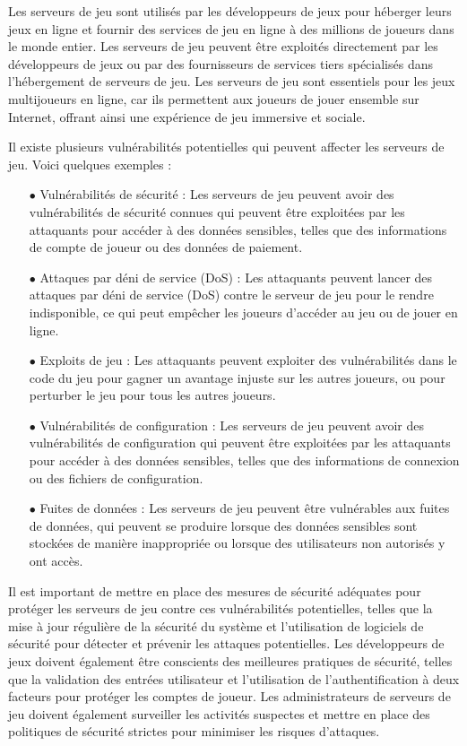Les serveurs de jeu sont utilisés par les développeurs de jeux pour héberger leurs jeux en ligne et fournir des services de jeu en ligne à des millions de joueurs dans le monde entier. Les serveurs de jeu peuvent être exploités directement par les développeurs de jeux ou par des fournisseurs de services tiers spécialisés dans l'hébergement de serveurs de jeu. Les serveurs de jeu sont essentiels pour les jeux multijoueurs en ligne, car ils permettent aux joueurs de jouer ensemble sur Internet, offrant ainsi une expérience de jeu immersive et sociale.
 

Il existe plusieurs vulnérabilités potentielles qui peuvent affecter les serveurs de jeu. Voici quelques exemples :
\begin{enumerate}
\item[$\bullet$]  Vulnérabilités de sécurité : Les serveurs de jeu peuvent avoir des vulnérabilités de sécurité connues qui peuvent être exploitées par les attaquants pour accéder à des données sensibles, telles que des informations de compte de joueur ou des données de paiement.
	
	\item[$\bullet$] Attaques par déni de service (DoS) : Les attaquants peuvent lancer des attaques par déni de service (DoS) contre le serveur de jeu pour le rendre indisponible, ce qui peut empêcher les joueurs d'accéder au jeu ou de jouer en ligne.
	
\item[$\bullet$]  Exploits de jeu : Les attaquants peuvent exploiter des vulnérabilités dans le code du jeu pour gagner un avantage injuste sur les autres joueurs, ou pour perturber le jeu pour tous les autres joueurs.
	
\item[$\bullet$]  Vulnérabilités de configuration : Les serveurs de jeu peuvent avoir des vulnérabilités de configuration qui peuvent être exploitées par les attaquants pour accéder à des données sensibles, telles que des informations de connexion ou des fichiers de configuration.
	
\item[$\bullet$] Fuites de données : Les serveurs de jeu peuvent être vulnérables aux fuites de données, qui peuvent se produire lorsque des données sensibles sont stockées de manière inappropriée ou lorsque des utilisateurs non autorisés y ont accès.
\end{enumerate}
Il est important de mettre en place des mesures de sécurité adéquates pour protéger les serveurs de jeu contre ces vulnérabilités potentielles, telles que la mise à jour régulière de la sécurité du système et l'utilisation de logiciels de sécurité pour détecter et prévenir les attaques potentielles. Les développeurs de jeux doivent également être conscients des meilleures pratiques de sécurité, telles que la validation des entrées utilisateur et l'utilisation de l'authentification à deux facteurs pour protéger les comptes de joueur. Les administrateurs de serveurs de jeu doivent également surveiller les activités suspectes et mettre en place des politiques de sécurité strictes pour minimiser les risques d'attaques.

